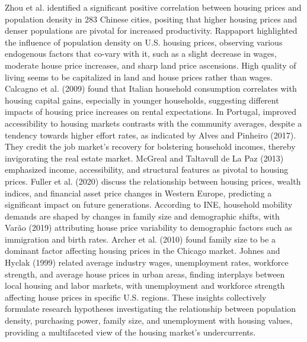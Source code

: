 \documentclass{aip-cp}
\begin{document}
Zhou et al.\cite{article_zhou} identified a significant positive correlation between housing prices and population density in 283 Chinese cities, positing that higher housing prices and denser populations are pivotal for increased productivity.
Rappaport\cite{rappaport2008consumption} highlighted the influence of population density on U.S. housing prices, observing various endogenous factors that co-vary with it, such as a slight decrease in wages, moderate house price increases, and sharp land price ascensions. High quality of living seems to be capitalized in land and house prices rather than wages. Calcagno et al. (2009) found that Italian household consumption correlates with housing capital gains, especially in younger households, suggesting different impacts of housing price increases on rental expectations.
In Portugal, improved accessibility to housing markets contrasts with the community averages, despite a tendency towards higher effort rates, as indicated by Alves and Pinheiro (2017). They credit the job market's recovery for bolstering household incomes, thereby invigorating the real estate market. McGreal and Taltavull de La Paz (2013) emphasized income, accessibility, and structural features as pivotal to housing prices.
Fuller et al. (2020) discuss the relationship between housing prices, wealth indices, and financial asset price changes in Western Europe, predicting a significant impact on future generations. According to INE, household mobility demands are shaped by changes in family size and demographic shifts, with Varão (2019) attributing house price variability to demographic factors such as immigration and birth rates. Archer et al. (2010) found family size to be a dominant factor affecting housing prices in the Chicago market.
Johnes and Hyclak (1999) related average industry wages, unemployment rates, workforce strength, and average house prices in urban areas, finding interplays between local housing and labor markets, with unemployment and workforce strength affecting house prices in specific U.S. regions.
These insights collectively formulate research hypotheses investigating the relationship between population density, purchasing power, family size, and unemployment with housing values, providing a multifaceted view of the housing market's undercurrents.
\end{document}
